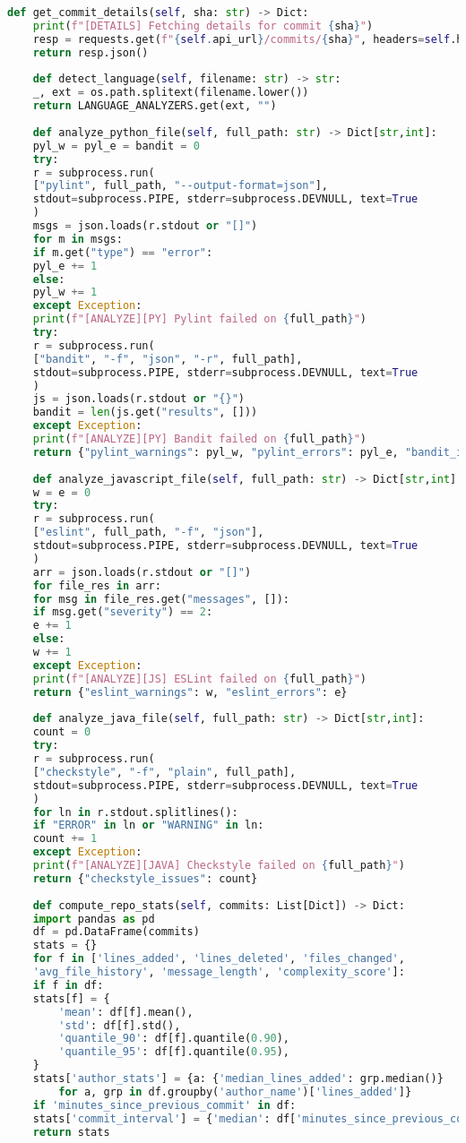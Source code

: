 \begin{lstlisting}[language=Python, caption={{ \texttt{repository\_analysis.py}}}]
	def get_commit_details(self, sha: str) -> Dict:
	print(f"[DETAILS] Fetching details for commit {sha}")
	resp = requests.get(f"{self.api_url}/commits/{sha}", headers=self.headers)
	return resp.json()
	
	def detect_language(self, filename: str) -> str:
	_, ext = os.path.splitext(filename.lower())
	return LANGUAGE_ANALYZERS.get(ext, "")
	
	def analyze_python_file(self, full_path: str) -> Dict[str,int]:
	pyl_w = pyl_e = bandit = 0
	try:
	r = subprocess.run(
	["pylint", full_path, "--output-format=json"],
	stdout=subprocess.PIPE, stderr=subprocess.DEVNULL, text=True
	)
	msgs = json.loads(r.stdout or "[]")
	for m in msgs:
	if m.get("type") == "error":
	pyl_e += 1
	else:
	pyl_w += 1
	except Exception:
	print(f"[ANALYZE][PY] Pylint failed on {full_path}")
	try:
	r = subprocess.run(
	["bandit", "-f", "json", "-r", full_path],
	stdout=subprocess.PIPE, stderr=subprocess.DEVNULL, text=True
	)
	js = json.loads(r.stdout or "{}")
	bandit = len(js.get("results", []))
	except Exception:
	print(f"[ANALYZE][PY] Bandit failed on {full_path}")
	return {"pylint_warnings": pyl_w, "pylint_errors": pyl_e, "bandit_issues": bandit}
	
	def analyze_javascript_file(self, full_path: str) -> Dict[str,int]:
	w = e = 0
	try:
	r = subprocess.run(
	["eslint", full_path, "-f", "json"],
	stdout=subprocess.PIPE, stderr=subprocess.DEVNULL, text=True
	)
	arr = json.loads(r.stdout or "[]")
	for file_res in arr:
	for msg in file_res.get("messages", []):
	if msg.get("severity") == 2:
	e += 1
	else:
	w += 1
	except Exception:
	print(f"[ANALYZE][JS] ESLint failed on {full_path}")
	return {"eslint_warnings": w, "eslint_errors": e}
	
	def analyze_java_file(self, full_path: str) -> Dict[str,int]:
	count = 0
	try:
	r = subprocess.run(
	["checkstyle", "-f", "plain", full_path],
	stdout=subprocess.PIPE, stderr=subprocess.DEVNULL, text=True
	)
	for ln in r.stdout.splitlines():
	if "ERROR" in ln or "WARNING" in ln:
	count += 1
	except Exception:
	print(f"[ANALYZE][JAVA] Checkstyle failed on {full_path}")
	return {"checkstyle_issues": count}
	
	def compute_repo_stats(self, commits: List[Dict]) -> Dict:
	import pandas as pd
	df = pd.DataFrame(commits)
	stats = {}
	for f in ['lines_added', 'lines_deleted', 'files_changed',
	'avg_file_history', 'message_length', 'complexity_score']:
	if f in df:
	stats[f] = {
		'mean': df[f].mean(),
		'std': df[f].std(),
		'quantile_90': df[f].quantile(0.90),
		'quantile_95': df[f].quantile(0.95),
	}
	stats['author_stats'] = {a: {'median_lines_added': grp.median()}
		for a, grp in df.groupby('author_name')['lines_added']}
	if 'minutes_since_previous_commit' in df:
	stats['commit_interval'] = {'median': df['minutes_since_previous_commit'].median()}
	return stats
	

\end{lstlisting}
